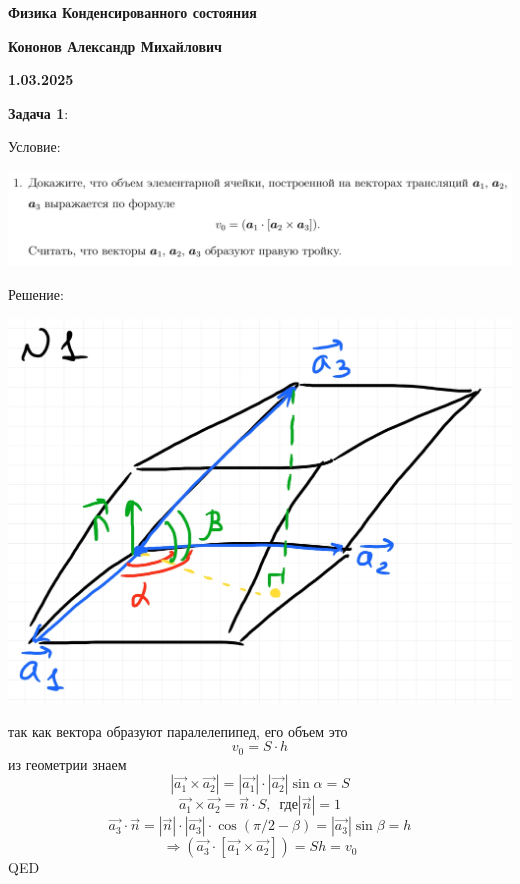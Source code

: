 \documentclass[12pt]{article}
\begin{document}
\begin{large}
\begin{center}
\LARGE \textbf{Физика Конденсированного состояния}
\par
\LARGE \textbf{Кононов Александр Михайлович}
\par
    \textbf{1.03.2025}
\end{center}
\par \textbf{Задача 1}:
\par Условие:
\par
\includegraphics[width=1\textwidth]{photo_1.png}
\par Решение:
\par
\includegraphics[width=1\textwidth]{photo_11.jpg}
\par
\par так как вектора образуют паралелепипед, его объем это
\[
    v_0 = S \cdot h
\]
из геометрии знаем
\[
    | \vec{a_1} \times \vec{a_2} | = |\vec{a_1}| \cdot |\vec{a_2}| \sin \alpha = S
\]
\[
    \vec{a_1} \times \vec{a_2} = \vec{n} \cdot S, \,\,\, \text{где} |\vec{n}| = 1
\]
\[
    \vec{a_3} \cdot \vec{n} = | \vec{n} | \cdot | \vec{a_3} | \cdot \cos(\pi/2 - \beta) = |\vec{a_3}|\sin \beta = h
\]
\[
    \Rightarrow (\vec{a_3} \cdot \left[ \vec{a_1} \times \vec{a_2} \right]) = S h = v_0
\]
QED


\end{large}
\end{document}
